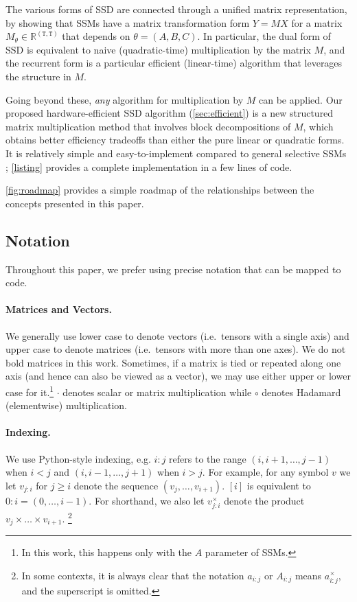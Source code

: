 The various forms of SSD are connected through a unified matrix representation, by showing that SSMs have a matrix transformation form $Y = MX$ for a matrix $M_\theta \in \mathbb{R}^{\mathtt{(T,T)}}$ that depends on $\theta = (A, B, C)$. In particular, the dual form of SSD is equivalent to naive (quadratic-time) multiplication by the matrix $M$, and the recurrent form is a particular efficient (linear-time) algorithm that leverages the structure in $M$.

Going beyond these, \emph{any} algorithm for multiplication by $M$ can be applied. Our proposed hardware-efficient SSD algorithm (\ref{sec:efficient}) is a new structured matrix multiplication method that involves block decompositions of $M$, which obtains better efficiency tradeoffs than either the pure linear or quadratic forms. It is relatively simple and easy-to-implement compared to general selective SSMs \citep{gu2023mamba};
\ref{listing} provides a complete implementation in a few lines of code.

\ref{fig:roadmap} provides a simple roadmap of the relationships between the concepts presented in this paper.

\subsection{Notation}

Throughout this paper, we prefer using precise notation that can be mapped to code.

\paragraph{Matrices and Vectors.} We generally use lower case to denote vectors (i.e.\ tensors with a single axis) and upper case to denote matrices (i.e.\ tensors with more than one axes). We do not bold matrices in this work. Sometimes, if a matrix is tied or repeated along one axis (and hence can also be viewed as a vector), we may use either upper or lower case for it.\footnote{In this work, this happens only with the $A$ parameter of SSMs.}
$\cdot$ denotes scalar or matrix multiplication while $\circ$ denotes Hadamard (elementwise) multiplication.

\paragraph{Indexing.}
We use Python-style indexing, e.g. $i:j$ refers to the range $(i, i+1, \dots, j-1)$ when $i < j$ and $(i, i-1, \dots, j+1)$ when $i > j$. For example, for any symbol $v$ we let $v_{j:i}$ for $j \ge i$ denote the sequence $(v_j, \dots, v_{i+1})$. $[i]$ is equivalent to $0:i = (0, \dots, i-1)$. For shorthand, we also let $v_{j:i}^\times$ denote the product $v_j \times \dots \times v_{i+1}$.
\footnote{In some contexts, it is always clear that the notation $a_{i:j}$ or $A_{i:j}$ means $a_{i:j}^\times$, and the superscript is omitted. }

